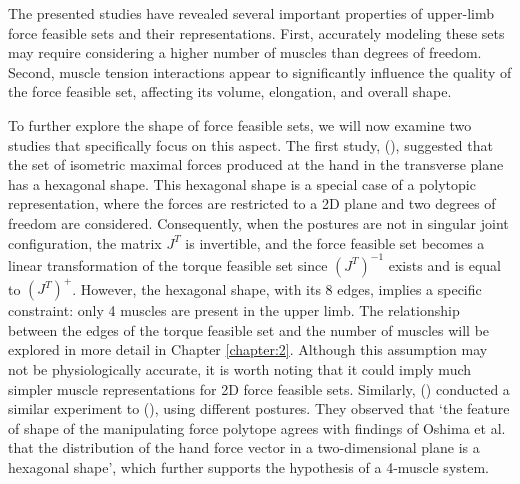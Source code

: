The presented studies have revealed several important properties of upper-limb force feasible sets and their representations. First, accurately modeling these sets may require considering a higher number of muscles than degrees of freedom. Second, muscle tension interactions appear to significantly influence the quality of the force feasible set, affecting its volume, elongation, and overall shape.

To further explore the shape of force feasible sets, we will now examine two studies that specifically focus on this aspect. The first study, (\cite{oshimaRoboticAnalysesOutput2000}), suggested that the set of isometric maximal forces produced at the hand in the transverse plane has a hexagonal shape. This hexagonal shape is a special case of a polytopic representation, where the forces are restricted to a 2D plane and two degrees of freedom are considered. Consequently, when the postures are not in singular joint configuration, the matrix $J^T$ is invertible, and the force feasible set becomes a linear transformation of the torque feasible set since $(J^T)^{-1}$ exists and is equal to $(J^T)^+$. However, the hexagonal shape, with its 8 edges, implies a specific constraint: only 4 muscles are present in the upper limb. The relationship between the edges of the torque feasible set and the number of muscles will be explored in more detail in Chapter \ref{chapter:2}. Although this assumption may not be physiologically accurate, it is worth noting that it could imply much simpler muscle representations for 2D force feasible sets. Similarly, (\cite{sasakiHigherDimensionalSpatial2010a}) conducted a similar experiment to (\cite{oshimaRoboticAnalysesOutput2000}), using different postures. They observed that `the feature of shape of the manipulating force polytope agrees with findings of Oshima et al. that the distribution of the hand force vector in a two-dimensional plane is a hexagonal shape', which further supports the hypothesis of a 4-muscle system.

